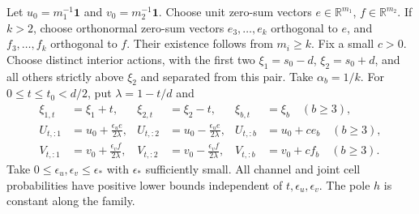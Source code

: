 \documentclass[11pt,reqno]{amsart}
\numberwithin{equation}{section}
\theoremstyle{definition}\newtheorem{definition}[theorem]{Definition}
\theoremstyle{remark}\newtheorem{remark}[theorem]{Remark}
\newcommand{\R}{\mathbb R}
\newcommand{\one}{\mathbf 1}
\begin{document}
Let $u_0=m_1^{-1}\one$ and $v_0=m_2^{-1}\one$. Choose unit zero-sum
vectors $e\in\R^{m_1}$, $f\in\R^{m_2}$. If $k>2$, choose
orthonormal zero-sum vectors $e_3,\ldots,e_k$ orthogonal to $e$,
and $f_3,\ldots,f_k$ orthogonal to $f$. Their existence follows from
$m_i\ge k$. Fix a small $c>0$. Choose distinct interior actions,
with the first two $\xi_1=s_0-d$, $\xi_2=s_0+d$, and all others
strictly above $\xi_2$ and separated from this pair. Take $\alpha_b=1/k$. For
$0\le t\le t_0<d/2$, put $\lambda=1-t/d$ and
\begin{align}
 \xi_{1,t}&=\xi_1+t,& \xi_{2,t}&=\xi_2-t,
       &\xi_{b,t}&=\xi_b\quad(b\ge3),\nonumber\\
 U_{t,:1}&=u_0+\frac{\epsilon_u e}{2\lambda},&
 U_{t,:2}&=u_0-\frac{\epsilon_u e}{2\lambda},&
 U_{t,:b}&=u_0+c e_b\quad(b\ge3),\label{eq:v87-lf}\\
 V_{t,:1}&=v_0+\frac{\epsilon_v f}{2\lambda},&
 V_{t,:2}&=v_0-\frac{\epsilon_v f}{2\lambda},&
 V_{t,:b}&=v_0+c f_b\quad(b\ge3).\nonumber
\end{align}
Take $0\le\epsilon_u,\epsilon_v\le\epsilon_*$ with $\epsilon_*$
sufficiently small. All channel and joint cell probabilities have
positive lower bounds independent of $t,\epsilon_u,\epsilon_v$.
The pole $h$ is constant along the family.
\end{document}

